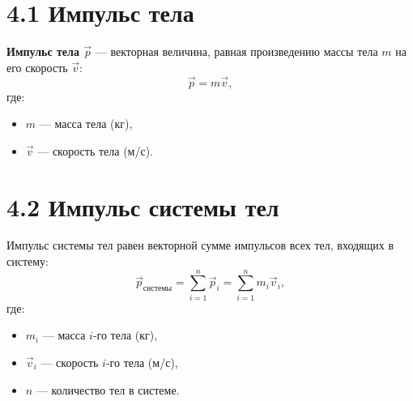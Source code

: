 \documentclass[a4paper,12pt]{article}
\begin{document}




\section*{4.1 Импульс тела}
\textbf{Импульс тела $\vec{p}$} — векторная величина, равная произведению массы тела \(m\) на его скорость \(\vec{v}\):
\vspace{-0.3em}
$$\vec{p} = m \vec{v},$$
где:
\begin{itemize}[itemsep=0pt, topsep=0pt, parsep=0pt]
  \setlength\itemsep{0em}
  \item \(m\) — масса тела (кг),
  \item \(\vec{v}\) — скорость тела (м/с).
\end{itemize}


\section*{4.2 Импульс системы тел}
Импульс системы тел равен векторной сумме импульсов всех тел, входящих в систему:
\vspace{-0.3em}
$$\vec{p}_{\text{системы}} = \sum_{i=1}^n \vec{p}_i = \sum_{i=1}^n m_i \vec{v}_i,$$
где:
\begin{itemize}[itemsep=0pt, topsep=0pt, parsep=0pt]
  \setlength\itemsep{0em}
  \item \(m_i\) — масса \(i\)-го тела (кг),
  \item \(\vec{v}_i\) — скорость \(i\)-го тела (м/с),
  \item \(n\) — количество тел в системе.
\end{itemize}
\end{document}
